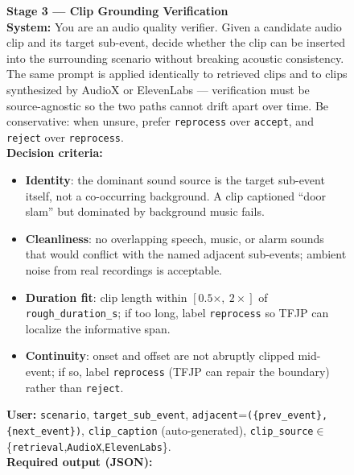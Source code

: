 \documentclass{llmxive}
\begin{document}
\begin{figure}[!htbp]
\centering
\begin{tcolorbox}[
  colback=promptbg, colbacktitle=promptbg, colframe=promptframe,
  coltitle=black,
  title=\textbf{Prompt Template (Hierarchical Event Curation, Part 2)},
  fonttitle=\bfseries,
  boxrule=0.5pt, arc=2pt,
  fontupper=\scriptsize,
  left=8pt, right=8pt, top=4pt, bottom=4pt
]
\textbf{Stage 3 --- Clip Grounding Verification}\\[1pt]
\textbf{System:} You are an audio quality verifier. Given a candidate
audio clip and its target sub-event, decide whether the clip can be
inserted into the surrounding scenario without breaking acoustic
consistency. The same prompt is applied identically to retrieved clips
and to clips synthesized by AudioX or ElevenLabs --- verification must
be source-agnostic so the two paths cannot drift apart over time. Be
conservative: when unsure, prefer \texttt{reprocess} over
\texttt{accept}, and \texttt{reject} over \texttt{reprocess}.\\[2pt]
\textbf{Decision criteria:}
\begin{itemize}\setlength\itemsep{0pt}\setlength\topsep{0pt}
  \item \textbf{Identity}: the dominant sound source is the target
        sub-event itself, not a co-occurring background. A clip
        captioned ``door slam'' but dominated by background music fails.
  \item \textbf{Cleanliness}: no overlapping speech, music, or alarm
        sounds that would conflict with the named adjacent sub-events;
        ambient noise from real recordings is acceptable.
  \item \textbf{Duration fit}: clip length within
        $[0.5\times,\ 2\times]$ of \texttt{rough\_duration\_s}; if too
        long, label \texttt{reprocess} so TFJP can localize the
        informative span.
  \item \textbf{Continuity}: onset and offset are not abruptly clipped
        mid-event; if so, label \texttt{reprocess} (TFJP can repair the
        boundary) rather than \texttt{reject}.
\end{itemize}
\textbf{User:} \texttt{scenario}, \texttt{target\_sub\_event},
\texttt{adjacent}=\verb|({prev_event},{next_event})|,
\texttt{clip\_caption} (auto-generated),
\texttt{clip\_source}$\in$\{\verb|retrieval|,\verb|AudioX|,\verb|ElevenLabs|\}.\\[2pt]
\textbf{Required output (JSON):}
\begin{itemize}\setlength\itemsep{0pt}\setlength\topsep{0pt}

\end{itemize}
\end{tcolorbox}
\end{figure}
\end{document}
